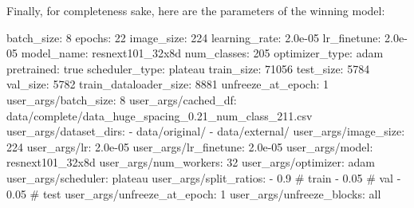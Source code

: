 \documentclass[]{article}
\newenvironment{Shaded}{\begin{snugshade}}{\end{snugshade}}
\newcommand{\NormalTok}[1]{\textcolor[rgb]{0.74,0.68,0.62}{#1}}
\begin{document}
Finally, for completeness sake, here are the parameters of the winning
model:

\begin{Shaded}
\begin{Highlighting}[]
\NormalTok{batch_size: 8}
\NormalTok{epochs: 22}
\NormalTok{image_size: 224}
\NormalTok{learning_rate: 2.0e-05}
\NormalTok{lr_finetune: 2.0e-05}
\NormalTok{model_name: resnext101_32x8d}
\NormalTok{num_classes: 205}
\NormalTok{optimizer_type: adam}
\NormalTok{pretrained: true}
\NormalTok{scheduler_type: plateau}
\NormalTok{train_size: 71056}
\NormalTok{test_size: 5784}
\NormalTok{val_size: 5782}
\NormalTok{train_dataloader_size: 8881}
\NormalTok{unfreeze_at_epoch: 1}
\NormalTok{user_args/batch_size: 8}
\NormalTok{user_args/cached_df: data/complete/data_huge_spacing_0.21_num_class_211.csv}
\NormalTok{user_args/dataset_dirs:}
\NormalTok{- data/original/}
\NormalTok{- data/external/}
\NormalTok{user_args/image_size: 224}
\NormalTok{user_args/lr: 2.0e-05}
\NormalTok{user_args/lr_finetune: 2.0e-05}
\NormalTok{user_args/model: resnext101_32x8d}
\NormalTok{user_args/num_workers: 32}
\NormalTok{user_args/optimizer: adam}
\NormalTok{user_args/scheduler: plateau}
\NormalTok{user_args/split_ratios:}
\NormalTok{- 0.9 # train}
\NormalTok{- 0.05 # val}
\NormalTok{- 0.05 # test}
\NormalTok{user_args/unfreeze_at_epoch: 1}
\NormalTok{user_args/unfreeze_blocks: all}
\end{Highlighting}
\end{Shaded}
\end{document}
